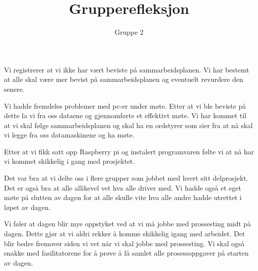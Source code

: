\documentclass[10pt,a4paper]{article}
\title{Grupperefleksjon}
\author{Gruppe 2}
\begin{document}
\maketitle
Vi registrerer at vi ikke har vært beviste på sammarbeidsplanen. Vi har bestemt at alle skal være mer bevist på sammarbeidsplanen og eventuelt revurdere den senere.

Vi hadde fremdeles problemer med pc-er under møte. Etter at vi ble beviste på dette la vi fra oss dataene og gjennomførte et effektivt møte. Vi har kommet til at vi skal følge sammarbeidsplanen og skal ha en ordstyrer som sier fra at nå skal vi legge fra oss datamaskinene og ha møte.

Etter at vi fikk satt opp Raspberry pi og instalert programvaren følte vi at nå har vi kommet skikkelig i gang med prosjektet.

Det var bra at vi delte oss i flere grupper som jobbet med hvert sitt delprosjekt. Det er også bra at alle allikevel vet hva alle driver med. Vi hadde også et eget møte på slutten av dagen for at alle skulle vite hva alle andre hadde utrettet i løpet av dagen.

Vi føler at dagen blir mye oppstyket ved at vi må jobbe med prossesting midt på dagen. Dette gjør at vi aldri rekker å komme skikkelig igang med arbeidet. Det blir bedre fremover siden vi vet når vi skal jobbe med prossesting. Vi skal også snakke med fasilitatorene for å prøve å få samlet alle prosessoppgaver på starten av dagen.
\end{document}
